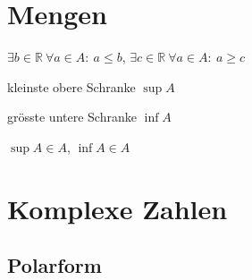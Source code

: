 \documentclass[11pt]{article}
\begin{document}
\section{Mengen}

\begin{description}[labelindent=16pt,style=multiline,leftmargin=6cm, noitemsep]
	\item[Obere/Untere Schranke:] $\exists b \in \mathbb{R}\ \forall a\in A:\ a \leq b$, $\exists c \in \mathbb{R}\ \forall a\in A:\ a \geq c$
	\item[Supremum:] kleinste obere Schranke $\sup A$
	\item[Infimum:] gr{\"o}sste untere Schranke $\inf A$
	\item[Maximum/Minimum:] $\sup A \in A$, $\inf A \in A$
\end{description}

\section{Komplexe Zahlen}

\subsection{Polarform}
\end{document}

